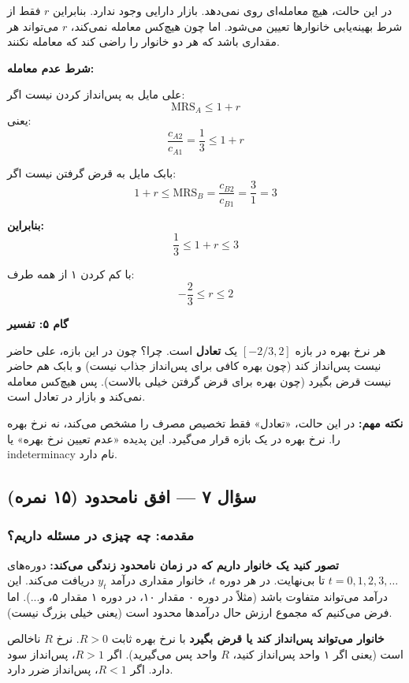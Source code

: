 \documentclass[12pt,a4paper]{article}
\newcommand{\MRS}{\mathrm{MRS}}
\begin{document}
در این حالت، هیچ معامله‌ای روی نمی‌دهد. بازار دارایی وجود ندارد. بنابراین $r$ فقط از شرط بهینه‌یابی خانوارها تعیین می‌شود. اما چون هیچ‌کس معامله نمی‌کند، $r$ می‌تواند هر مقداری باشد که هر دو خانوار را راضی کند که معامله نکنند.

\textbf{شرط عدم معامله:}

علی مایل به پس‌انداز کردن نیست اگر:
\[
	\MRS_A \leq 1+r
\]
یعنی:
\[
	\frac{c_{A2}}{c_{A1}} = \frac{1}{3} \leq 1+r
\]

بابک مایل به قرض گرفتن نیست اگر:
\[
	1+r \leq \MRS_B = \frac{c_{B2}}{c_{B1}} = \frac{3}{1} = 3
\]

\textbf{بنابراین:}
\[
	\frac{1}{3} \leq 1+r \leq 3
\]

با کم کردن ۱ از همه طرف:
\[
	\boxed{-\frac{2}{3} \leq r \leq 2}
\]

\textbf{گام ۵: تفسیر}

هر نرخ بهره در بازه $[-2/3, 2]$ یک \textbf{تعادل} است. چرا؟ چون در این بازه، علی حاضر نیست پس‌انداز کند (چون بهره کافی برای پس‌انداز جذاب نیست) و بابک هم حاضر نیست قرض بگیرد (چون بهره برای قرض گرفتن خیلی بالاست). پس هیچ‌کس معامله نمی‌کند و بازار در تعادل است.

\textbf{نکته مهم:} در این حالت، «تعادل» فقط تخصیص مصرف را مشخص می‌کند، نه نرخ بهره را. نرخ بهره در یک بازه قرار می‌گیرد. این پدیده «عدم تعیین نرخ بهره» یا indeterminacy نام دارد.

\subsection{سؤال ۷ — افق نامحدود (۱۵ نمره)}

\subsubsection{مقدمه: چه چیزی در مسئله داریم؟}

\textbf{تصور کنید یک خانوار داریم که در زمان نامحدود زندگی می‌کند:} دوره‌های $t = 0, 1, 2, 3, \ldots$ تا بی‌نهایت. در هر دوره $t$، خانوار مقداری درآمد $y_t$ دریافت می‌کند. این درآمد می‌تواند متفاوت باشد (مثلاً در دوره ۰ مقدار ۱۰، در دوره ۱ مقدار ۵، و...). اما فرض می‌کنیم که مجموع ارزش حال درآمدها محدود است (یعنی خیلی بزرگ نیست).

\textbf{خانوار می‌تواند پس‌انداز کند یا قرض بگیرد} با نرخ بهره ثابت $R > 0$. نرخ $R$ ناخالص است (یعنی اگر ۱ واحد پس‌انداز کنید، $R$ واحد پس می‌گیرید). اگر $R > 1$، پس‌انداز سود دارد. اگر $R < 1$، پس‌انداز ضرر دارد.
\end{document}
